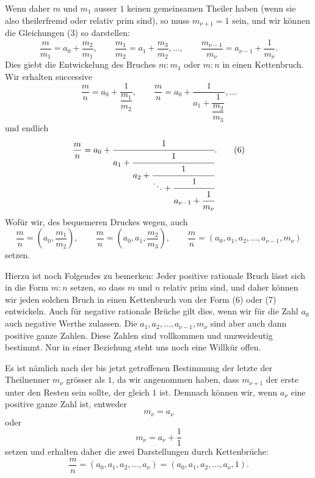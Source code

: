 \documentclass[11pt]{article}
\begin{document}
Wenn daher $m$ und $m_1$ ausser $1$ keinen gemeinsamen Theiler haben (wenn sie also theilerfremd oder relativ prim sind), so muss $m_{\nu+1}=1$ sein, und wir können die Gleichungen (3) so darstellen:
\begin{equation}
        \frac{m}{m_1}=a_0+\frac{m_2}{m_1},\qquad
        \frac{m_1}{m_2}=a_1+\frac{m_3}{m_2},\ldots,\qquad
        \frac{m_{\nu-1}}{m_\nu}=a_{\nu-1}+\frac1{m_\nu}.
\tag{4}
\end{equation}
Dies giebt die Entwickelung des Bruches $m:m_1$ oder $m:n$ in einen Kettenbruch. Wir erhalten successive
\begin{equation}
        \frac mn=a_0+\frac1{\dfrac{m_1}{m_2}},\qquad
        \frac mn=a_0+\frac1{a_1+\dfrac1{\dfrac{m_2}{m_3}}},\ldots
\tag{5}
\end{equation}
und endlich
\begin{equation}
        \frac mn=a_0+\cfrac1{a_1+\cfrac1{a_2+\cfrac1{\ddots+\cfrac1{a_{\nu-1}+\cfrac1{m_\nu}}}}}.
\tag{6}
\end{equation}
Wofür wir, des bequemeren Druckes wegen, auch
\begin{equation}
        \frac mn=\left(a_0,\frac{m_1}{m_2}\right),\qquad
        \frac mn=\left(a_0,a_1,\frac{m_2}{m_3}\right),
        \qquad
        \frac mn=(a_0,a_1,a_2,\ldots,a_{\nu-1},m_\nu)
\tag{7}
\end{equation}
setzen.

Hierzu ist noch Folgendes zu bemerken: Jeder positive rationale Bruch lässt sich in die Form $m:n$ setzen, so dass $m$ und $n$ relativ prim sind, und daher können wir jeden solchen Bruch in einen Kettenbruch von der Form (6) oder (7) entwickeln. Auch für negative rationale Brüche gilt dies, wenn wir für die Zahl $a_0$ auch negative Werthe zulassen. Die $a_1,a_2,\ldots,a_{\nu-1},m_\nu$ sind aber auch dann positive ganze Zahlen. Diese Zahlen sind vollkommen und unzweideutig bestimmt. Nur in einer Beziehung steht uns noch eine Willkür offen.

Es ist nämlich nach der bis jetzt getroffenen Bestimmung der letzte der Theilnenner $m_\nu$ grösser als $1$, da wir angenommen haben, dass $m_{\nu+1}$ der erste unter den Resten sein sollte, der gleich $1$ ist. Demnach können wir, wenn $a_\nu$ eine positive ganze Zahl ist, entweder
\[
        m_\nu=a_\nu
\]
oder
\[
        m_\nu=a_\nu+\frac11
\]
setzen und erhalten daher die zwei Darstellungen durch Kettenbrüche:
\begin{equation}
        \frac mn=(a_0,a_1,a_2,\ldots,a_\nu)
        =(a_0,a_1,a_2,\ldots,a_\nu,1).
\tag{8}
\end{equation}
\end{document}
